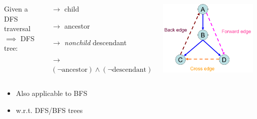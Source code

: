 \begin{frame}{}
  \begin{definition}
    \begin{columns}
	Given a DFS traversal $\implies$ DFS tree:
	\begin{description}
	  \item[Tree edge:] $\to$ child \\[10pt]
	  \item[Back edge:] $\to$ ancestor
	  \item[Forward edge:] $\to$ \emph{nonchild} descendant
	  \item[Cross edge:] $\to$ $(\lnot \text{ancestor}) \land (\lnot \text{descendant})$
	\end{description}
	\includegraphics[width = 0.95\textwidth]{figs/dfs-digraph.png}
    \end{columns}
  \end{definition}

  \pause
  \vspace{0.50cm}
  \begin{itemize}
    \centering
    \item Also applicable to BFS
    \item w.r.t. DFS/BFS trees
  \end{itemize}
\end{frame}

